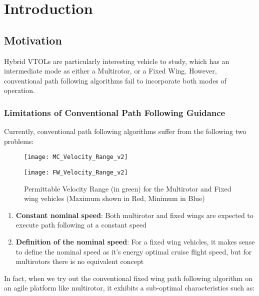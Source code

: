 \chapter{Introduction}
\label{ch:introduction}

\section{Motivation}

Hybrid VTOLs are particularly interesting vehicle to study, which has an intermediate mode as either a Multirotor, or a Fixed Wing. However, conventional path following algorithms fail to incorporate both modes of operation.

\subsection*{Limitations of Conventional Path Following Guidance}

Currently, conventional path following algorithms suffer from the following two problems:

\begin{figure}[h]
  \begin{minipage}[t]{0.48\textwidth}
    \texttt{[image: MC\_Velocity\_Range\_v2]}
  \end{minipage}
  \hfill
  \begin{minipage}[t]{0.48\textwidth}
    \texttt{[image: FW\_Velocity\_Range\_v2]}
  \end{minipage}
  \caption{Permittable Velocity Range (in green) for the Multirotor and Fixed wing vehicles (Maximum shown in Red, Minimum in Blue)}
  \label{pics:cycle}
\end{figure}

\begin{enumerate}
    \item \textbf{Constant nominal speed}: Both multirotor and fixed wings are expected to execute path following at a constant speed
    \item \textbf{Definition of the nominal speed}: For a fixed wing vehicles, it makes sense to define the nominal speed as it's energy optimal cruise flight speed, but for multirotors there is no equivalent concept
\end{enumerate}

In fact, when we try out the conventional fixed wing path following algorithm on an agile platform like multirotor, it exhibits a sub-optimal characteristics such as:

